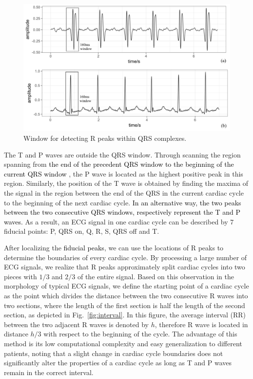 \begin{figure}[t]
\centering
\includegraphics[scale=.5]{Fig/window.pdf}
\caption{Window for detecting R peaks within QRS complexes.}
\label{fig:window}
\end{figure}


The T and P waves are outside the QRS window. Through scanning the region spanning from \textcolor{black}{the end of the precedent QRS window to the beginning of the current QRS window}%
, the P wave is located as the highest positive peak in this region. Similarly, the position of the T wave is obtained by finding the maxima of the signal in the region between the end of the QRS in the current cardiac cycle to the beginning of the next cardiac cycle. \textcolor{black}{In an alternative way, the two peaks between the two consecutive QRS windows, respectively represent the T and P waves.}
As a result, an ECG signal in one cardiac cycle can be described by 7 fiducial points: P, QRS on, Q, R, S, QRS off and T. 

After localizing the \textcolor{black}{fiducial peaks}, we can use the locations of R peaks to determine the boundaries of every cardiac cycle. %
By processing a large number of ECG signals, we realize that R peaks approximately split cardiac cycles into two pieces with $1/3$ and $2/3$ of the entire signal\cite{2012qrs}. %
Based on this observation in the morphology of typical ECG signals, we define the starting point of a cardiac cycle as the point which divides the distance between the two consecutive R waves into two sections, where the length of the first section is half the length of the second section, as depicted in Fig.~\ref{fig:interval}. In this figure, the average interval (RR) between the two adjacent R waves is denoted by $h$, therefore R wave is located in distance $h/3$ with respect to the beginning of the cycle. The advantage of this method is its low computational complexity and easy generalization to different patients, noting that a slight change in cardiac cycle boundaries does not significantly alter the properties of a cardiac cycle as long as T and P waves remain in the correct interval. 

